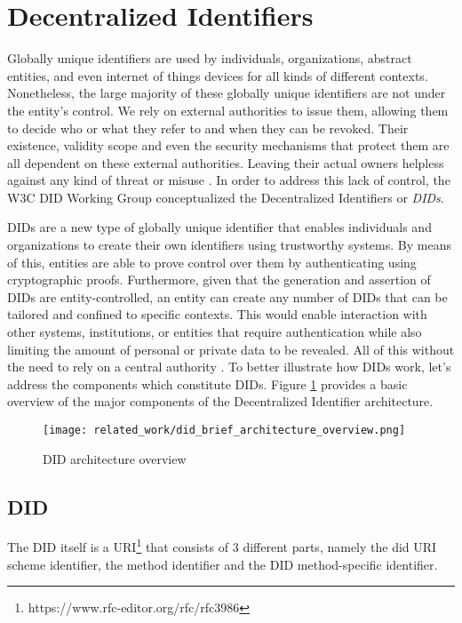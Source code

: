 \section{Decentralized Identifiers} \label{section:dids}

Globally unique identifiers are used by individuals, organizations, abstract entities, and even internet of things devices for all kinds of different contexts. Nonetheless, the large majority of these globally unique identifiers are not under the entity's control. We rely on external authorities to issue them, allowing them to decide who or what they refer to and when they can be revoked. Their existence, validity scope and even the security mechanisms that protect them are all dependent on these external authorities. Leaving their actual owners helpless against any kind of threat or misuse \cite{sporny_longley_sabadello_reed_steele_2021}. In order to address this lack of control, the W3C DID Working Group conceptualized the Decentralized Identifiers or \emph{DIDs}.

DIDs are a new type of globally unique identifier that enables individuals and organizations to create their own identifiers using trustworthy systems. By means of this, entities are able to prove control over them by authenticating using cryptographic proofs. Furthermore, given that the generation and assertion of DIDs are entity-controlled, an entity can create any number of DIDs that can be tailored and confined to specific contexts. This would enable interaction with other systems, institutions, or entities that require authentication while also limiting the amount of personal or private data to be revealed. All of this without the need to rely on a central authority \cite{sporny_longley_sabadello_reed_steele_2021}. To better illustrate how DIDs work, let's address the components which constitute DIDs. Figure \ref{fig:did_architecture} provides a basic overview of the major components of the Decentralized Identifier architecture.

\begin{figure}[H]
  \centering
  \texttt{[image: related\_work/did\_brief\_architecture\_overview.png]}
  \caption{DID architecture overview \cite{sporny_longley_sabadello_reed_steele_2021}}
  \label{fig:did_architecture}
\end{figure}

\subsection{DID}  
The DID itself is a URI\footnote{https://www.rfc-editor.org/rfc/rfc3986} that consists of 3 different parts, namely the did URI scheme identifier, the method identifier and the DID method-specific identifier.

